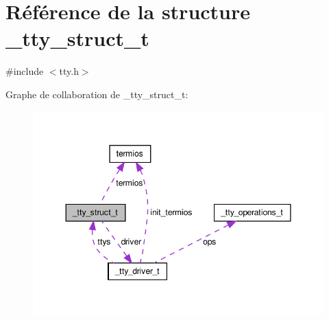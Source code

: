\hypertarget{struct__tty__struct__t}{\section{\-Référence de la structure \-\_\-tty\-\_\-struct\-\_\-t}
\label{struct__tty__struct__t}
}


{\ttfamily \#include $<$tty.\-h$>$}



\-Graphe de collaboration de \-\_\-tty\-\_\-struct\-\_\-t\-:\nopagebreak
\begin{figure}[H]
\begin{center}
\leavevmode
\includegraphics[width=347pt]{struct__tty__struct__t__coll__graph}
\end{center}
\end{figure}
